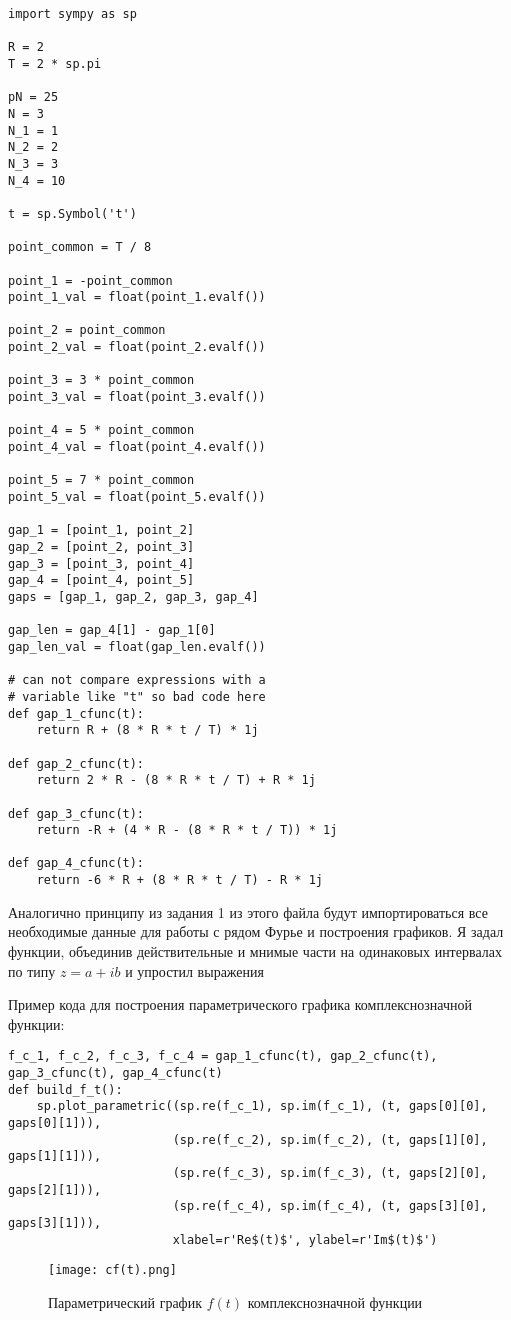 \documentclass[a4paper, 16pt]{article}
\begin{document}
\begin{lstlisting}
import sympy as sp

R = 2
T = 2 * sp.pi
    
pN = 25
N = 3
N_1 = 1
N_2 = 2
N_3 = 3
N_4 = 10
    
t = sp.Symbol('t')
    
point_common = T / 8
    
point_1 = -point_common
point_1_val = float(point_1.evalf())
    
point_2 = point_common
point_2_val = float(point_2.evalf())
    
point_3 = 3 * point_common
point_3_val = float(point_3.evalf())
    
point_4 = 5 * point_common
point_4_val = float(point_4.evalf())
    
point_5 = 7 * point_common
point_5_val = float(point_5.evalf())
    
gap_1 = [point_1, point_2]
gap_2 = [point_2, point_3]
gap_3 = [point_3, point_4]
gap_4 = [point_4, point_5]
gaps = [gap_1, gap_2, gap_3, gap_4]
    
gap_len = gap_4[1] - gap_1[0]
gap_len_val = float(gap_len.evalf())
    
# can not compare expressions with a
# variable like "t" so bad code here
def gap_1_cfunc(t):
    return R + (8 * R * t / T) * 1j
    
def gap_2_cfunc(t):
    return 2 * R - (8 * R * t / T) + R * 1j
    
def gap_3_cfunc(t):
    return -R + (4 * R - (8 * R * t / T)) * 1j
    
def gap_4_cfunc(t):
    return -6 * R + (8 * R * t / T) - R * 1j
\end{lstlisting}


\noindent Аналогично принципу из задания 1 из этого файла будут импортироваться все
необходимые данные для работы с рядом Фурье и построения графиков. Я задал функции,
объединив действительные и мнимые части на одинаковых интервалах по типу $z=a+ib$ и
упростил выражения


\newpage
\noindent Пример кода для построения параметрического графика комплекснозначной функции:
\begin{lstlisting}[belowskip=-3mm]
f_c_1, f_c_2, f_c_3, f_c_4 = gap_1_cfunc(t), gap_2_cfunc(t), gap_3_cfunc(t), gap_4_cfunc(t)
def build_f_t():
    sp.plot_parametric((sp.re(f_c_1), sp.im(f_c_1), (t, gaps[0][0], gaps[0][1])),
                       (sp.re(f_c_2), sp.im(f_c_2), (t, gaps[1][0], gaps[1][1])),
                       (sp.re(f_c_3), sp.im(f_c_3), (t, gaps[2][0], gaps[2][1])),
                       (sp.re(f_c_4), sp.im(f_c_4), (t, gaps[3][0], gaps[3][1])), 
                       xlabel=r'Re$(t)$', ylabel=r'Im$(t)$')
\end{lstlisting}
\begin{figure}[!htb]
    \centering
    \texttt{[image: cf(t).png]}
    \captionsetup{skip=0pt}
    \caption{Параметрический график $f(t)$ комплекснозначной функции}
    \label{Рис:35}
\end{figure}
\end{document}
